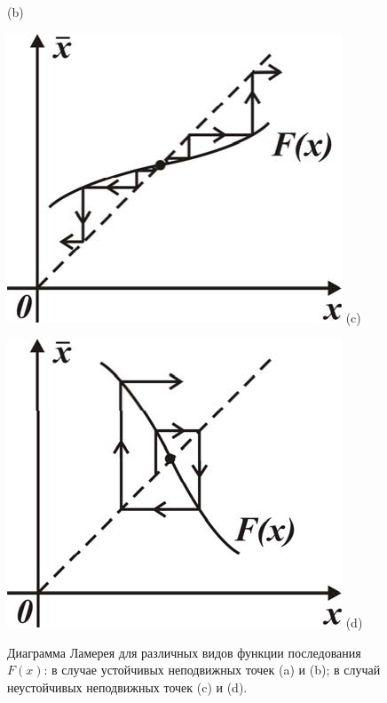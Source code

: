 \begin{figure}[h]
\begin{minipage}{0.49\linewidth}
                (b)
        \end{minipage}
        \begin{minipage}{0.49\linewidth}
                \centering
                \includegraphics[width=\linewidth]{fig/lect6/5c}
                (c)
        \end{minipage}
        \begin{minipage}{0.49\linewidth}
                \centering
                \includegraphics[width=\linewidth]{fig/lect6/5d}
                (d)
        \end{minipage}
        \caption{Диаграмма Ламерея для различных видов функции последования $F(x)$:
        в случае устойчивых неподвижных точек (a) и (b); в случай неустойчивых неподвижных
точек (c) и (d).}
        \label{fig:6.5}
\end{figure}
